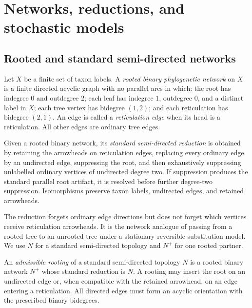\section{Networks, reductions, and stochastic models}\label{sec:definitions}

\subsection{Rooted and standard semi-directed networks}

Let $X$ be a finite set of taxon labels.  A \emph{rooted binary phylogenetic network} on $X$ is a finite directed acyclic graph with no parallel arcs in which: the root has indegree $0$ and outdegree $2$; each leaf has indegree $1$, outdegree $0$, and a distinct label in $X$; each tree vertex has bidegree $(1,2)$; and each reticulation has bidegree $(2,1)$.  An edge is called a \emph{reticulation edge} when its head is a reticulation.  All other edges are ordinary tree edges.

\begin{definition}
Given a rooted binary network, its \emph{standard semi-directed reduction} is obtained by retaining the arrowheads on reticulation edges, replacing every ordinary edge by an undirected edge, suppressing the root, and then exhaustively suppressing unlabelled ordinary vertices of undirected degree two.  If suppression produces the standard parallel root artifact, it is resolved before further degree-two suppression.  Isomorphisms preserve taxon labels, undirected edges, and retained arrowheads.
\end{definition}

The reduction forgets ordinary edge directions but does not forget which vertices receive reticulation arrowheads.  It is the network analogue of passing from a rooted tree to an unrooted tree under a stationary reversible substitution model.  We use $N$ for a standard semi-directed topology and $N^+$ for one rooted partner.

\begin{definition}
An \emph{admissible rooting} of a standard semi-directed topology $N$ is a rooted binary network $N^+$ whose standard reduction is $N$.  A rooting may insert the root on an undirected edge or, when compatible with the retained arrowhead, on an edge entering a reticulation.  All directed edges must form an acyclic orientation with the prescribed binary bidegrees.
\end{definition}

